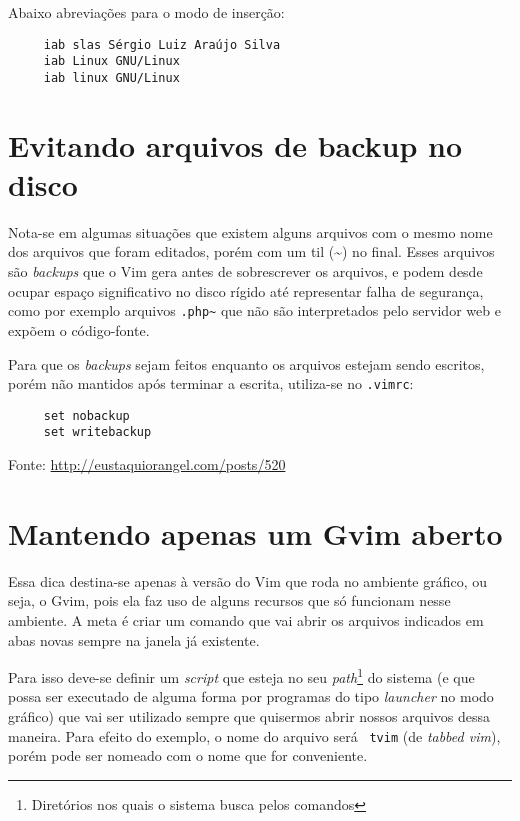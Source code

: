 Abaixo abreviações para o modo de inserção:

\begin{verbatim}
     iab slas Sérgio Luiz Araújo Silva
     iab Linux GNU/Linux
     iab linux GNU/Linux
\end{verbatim}

\section{Evitando arquivos de backup no disco}
\label{Evitando arquivos de backup no disco}

Nota-se em algumas situações que existem alguns arquivos com o mesmo nome dos
arquivos que foram editados, porém com um til (\textasciitilde) no final. Esses
arquivos são {\em backups} que o Vim gera antes de sobrescrever os arquivos, e
podem desde ocupar espaço significativo no disco rígido até representar falha
de segurança, como por exemplo arquivos {\tt .php\textasciitilde} que não são
interpretados pelo servidor web e expõem o código-fonte.

Para que os {\em backups} sejam feitos enquanto os arquivos estejam sendo escritos, porém não 
mantidos após terminar a escrita, utiliza-se no \verb|.vimrc|:

\begin{verbatim}
     set nobackup
     set writebackup
\end{verbatim}

Fonte: \url{http://eustaquiorangel.com/posts/520}

\section{Mantendo apenas um Gvim aberto}
\label{Mantenddo apenas um Gvim aberto}

Essa dica destina-se apenas à versão do Vim que roda no ambiente gráfico, ou
seja, o Gvim, pois ela faz uso de alguns recursos que só funcionam nesse
ambiente. A meta é criar um comando que vai abrir os arquivos indicados em abas
novas sempre na janela já existente. 

Para isso deve-se definir um {\em script} que esteja no seu
{\em path}\footnote{Diretórios nos quais o sistema busca pelos comandos} do sistema
(e que possa ser executado de alguma forma por programas do tipo {\em launcher}
no modo gráfico) que vai ser utilizado sempre que quisermos abrir nossos
arquivos dessa maneira. Para efeito do exemplo, o nome do arquivo será {\tt
tvim} (de {\em tabbed vim}), porém pode ser nomeado com o nome que for
conveniente.

